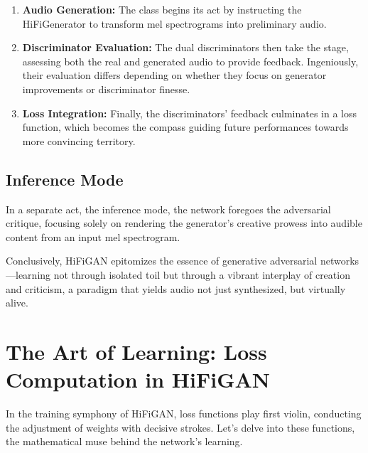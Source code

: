 \documentclass[a4paper]{article}
\begin{document}
\begin{enumerate}
  \item \textbf{Audio Generation:} The class begins its act by instructing the HiFiGenerator to transform mel spectrograms into preliminary audio.
  
  \item \textbf{Discriminator Evaluation:} The dual discriminators then take the stage, assessing both the real and generated audio to provide feedback. Ingeniously, their evaluation differs depending on whether they focus on generator improvements or discriminator finesse.
  
  \item \textbf{Loss Integration:} Finally, the discriminators' feedback culminates in a loss function, which becomes the compass guiding future performances towards more convincing territory.
\end{enumerate}

\subsection{Inference Mode}

In a separate act, the inference mode, the network foregoes the adversarial critique, focusing solely on rendering the generator’s creative prowess into audible content from an input mel spectrogram.


Conclusively, HiFiGAN epitomizes the essence of generative adversarial networks—learning not through isolated toil but through a vibrant interplay of creation and criticism, a paradigm that yields audio not just synthesized, but virtually alive.



\section{The Art of Learning: Loss Computation in HiFiGAN}

In the training symphony of HiFiGAN, loss functions play first violin, conducting the adjustment of weights with decisive strokes. Let's delve into these functions, the mathematical muse behind the network's learning.
\end{document}

